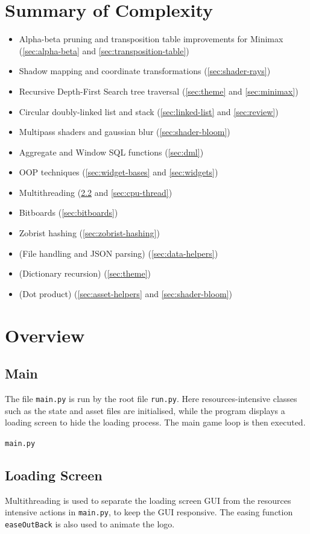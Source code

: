 \documentclass[../main/main.tex]{subfiles}
\begin{document}
\section{Summary of Complexity}
\begin{itemize}
\item Alpha-beta pruning and transposition table improvements for Minimax (\ref{sec:alpha-beta} and \ref{sec:transposition-table})
\item Shadow mapping and coordinate transformations (\ref{sec:shader-rays})
\item Recursive Depth-First Search tree traversal (\ref{sec:theme} and \ref{sec:minimax})
\item Circular doubly-linked list and stack (\ref{sec:linked-list} and \ref{sec:review})
\item Multipass shaders and gaussian blur (\ref{sec:shader-bloom})
\item Aggregate and Window SQL functions (\ref{sec:dml})
\item OOP techniques (\ref{sec:widget-bases} and \ref{sec:widgets})
\item Multithreading (\ref{sec:loading-screen} and \ref{sec:cpu-thread})
\item Bitboards (\ref{sec:bitboards})
\item Zobrist hashing (\ref{sec:zobrist-hashing})
\item (File handling and JSON parsing) (\ref{sec:data-helpers})
\item (Dictionary recursion) (\ref{sec:theme})
\item (Dot product) (\ref{sec:asset-helpers} and \ref{sec:shader-bloom})
\end{itemize}

\section{Overview}
\subsection{Main}
The file \lstinline{main.py} is run by the root file \lstinline{run.py}. Here resources-intensive classes such as the state and asset files are initialised, while the program displays a loading screen to hide the loading process. The main game loop is then executed.

\noindent\verb|main.py|


\subsection{Loading Screen}
\label{sec:loading-screen}
Multithreading is used to separate the loading screen GUI from the resources intensive actions in \lstinline{main.py}, to keep the GUI responsive. The easing function \lstinline{easeOutBack} is also used to animate the logo.
\end{document}
